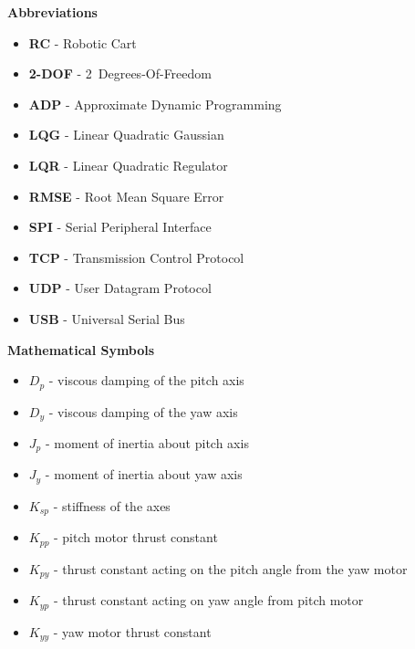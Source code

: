 
\renewcommand{\nomname}{Nomenclature}
\renewcommand{\nomAname}{\textbf{\large Abbreviations}}
\renewcommand{\nomGname}{\textbf{\large Mathematical Symbols}}
\renewcommand{\nomXname}{\textbf{\large Superscripts}}
\renewcommand{\nomZname}{\textbf{\large Subscripts}}

\printnomenclature
\cleardoublepage
{} %


\nomAname
\bigbreak
\begin{itemize}
    \item[]\textbf{RC} - Robotic Cart
    \item[]\textbf{2-DOF} - 2~Degrees-Of-Freedom
    \item[]\textbf{ADP} - Approximate Dynamic Programming
    \item[] \textbf{LQG} - Linear Quadratic Gaussian
    \item[]\textbf{LQR} - Linear Quadratic Regulator
    \item[]\textbf{RMSE} - Root Mean Square Error
    \item[]\textbf{SPI} - Serial Peripheral Interface
    \item[]\textbf{TCP} - Transmission Control Protocol
    \item[]\textbf{UDP} - User Datagram Protocol
    \item[]\textbf{USB} - Universal Serial Bus
\end{itemize}

\nomGname
\bigbreak
\begin{itemize}
    \item[]$D_p$ - viscous damping of the pitch axis
    \item[]$D_y$ - viscous damping of the yaw axis
    \item[]$J_p$ - moment of inertia about pitch axis
    \item[]$J_y$ - moment of inertia about yaw axis
    \item[]$K_{sp}$ - stiffness of the axes
    \item[]$K_{pp}$ - pitch motor thrust constant
    \item[]$K_{py}$ - thrust constant acting on the pitch angle from the yaw motor
    \item[]$K_{yp}$ - thrust constant acting on yaw angle from pitch motor
    \item[]$K_{yy}$ - yaw motor thrust constant
\end{itemize}


